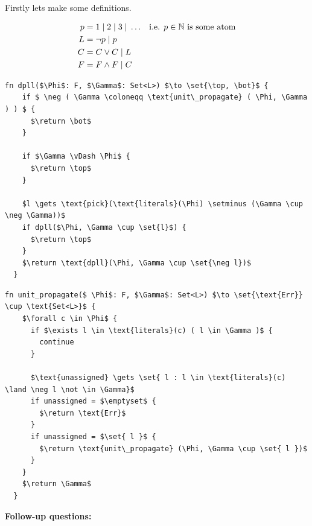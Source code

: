 \documentclass[../main.tex]{subfiles}
\begin{document}

Firstly lets make some definitions.
\newcommand{\union}{\; \vert \;}
\newcommand{\return}{\; \hookrightarrow \;}

\begin{align*}
	p & = 1 \union 2 \union 3 \union \ldots &  & \text{i.e. $p \in \N$ is some atom} \\
	L & = \neg p \union p                                                            \\
	C & = C \lor C \union L                                                          \\
	F & = F \land F \union C
\end{align*}


\begin{algorithm}
	\caption{DPLL}
	\begin{lstlisting}[style=pseudo]
  fn dpll($\Phi$: F, $\Gamma$: Set<L>) $\to \set{\top, \bot}$ {
    if $ \neg ( \Gamma \coloneqq \text{unit\_propagate} ( \Phi, \Gamma ) ) $ {
      $\return \bot$ 
    }

    if $\Gamma \vDash \Phi$ {
      $\return \top$ 
    }

    $l \gets \text{pick}(\text{literals}(\Phi) \setminus (\Gamma \cup \neg \Gamma))$
    if dpll($\Phi, \Gamma \cup \set{l}$) {
      $\return \top$
    }
    $\return \text{dpll}(\Phi, \Gamma \cup \set{\neg l})$
  }
\end{lstlisting}
\end{algorithm}

\begin{algorithm}
	\caption{Unit Propagate}
	\begin{lstlisting}[style=pseudo]
  fn unit_propagate($ \Phi$: F, $\Gamma$: Set<L>) $\to \set{\text{Err}} \cup \text{Set<L>}$ {
    $\forall c \in \Phi$ {
      if $\exists l \in \text{literals}(c) ( l \in \Gamma )$ {
        continue
      }

      $\text{unassigned} \gets \set{ l : l \in \text{literals}(c) \land \neg l \not \in \Gamma}$  
      if unassigned = $\emptyset$ {
        $\return \text{Err}$
      }
      if unassigned = $\set{ l }$ {
        $\return \text{unit\_propagate} (\Phi, \Gamma \cup \set{ l })$ 
      }
    }
    $\return \Gamma$
  }
\end{lstlisting}
\end{algorithm}

\textbf{Follow-up questions:}
\end{document}
